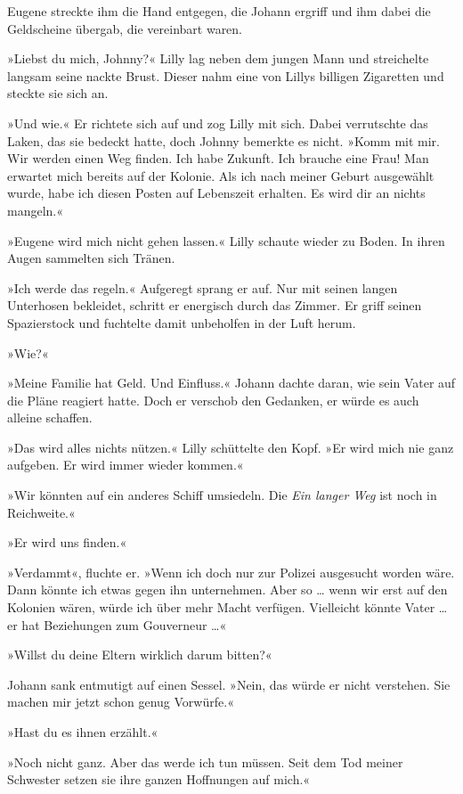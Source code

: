 Eugene streckte ihm die Hand entgegen, die Johann ergriff und ihm
dabei die Geldscheine übergab, die vereinbart waren.

\tb

»Liebst du mich, Johnny?« Lilly lag neben dem jungen Mann und
streichelte langsam seine nackte Brust. Dieser nahm eine von Lillys
billigen Zigaretten und steckte sie sich an.

»Und wie.« Er richtete sich auf und zog Lilly mit sich. Dabei
verrutschte das Laken, das sie bedeckt hatte, doch Johnny bemerkte
es nicht. »Komm mit mir. Wir werden einen Weg finden. Ich habe
Zukunft. Ich brauche eine Frau! Man erwartet mich bereits auf der
Kolonie. Als ich nach meiner Geburt ausgewählt wurde, habe ich
diesen Posten auf Lebenszeit erhalten. Es wird dir an nichts
mangeln.«

»Eugene wird mich nicht gehen lassen.« Lilly schaute wieder zu
Boden. In ihren Augen sammelten sich Tränen.

»Ich werde das regeln.« Aufgeregt sprang er auf. Nur mit seinen
langen Unterhosen bekleidet, schritt er energisch durch das Zimmer.
Er griff seinen Spazierstock und fuchtelte damit unbeholfen in der
Luft herum.

»Wie?«

»Meine Familie hat Geld. Und Einfluss.« Johann dachte daran, wie
sein Vater auf die Pläne reagiert hatte. Doch er verschob den
Gedanken, er würde es auch alleine schaffen.

»Das wird alles nichts nützen.« Lilly schüttelte den Kopf. »Er wird
mich nie ganz aufgeben. Er wird immer wieder kommen.«

»Wir könnten auf ein anderes Schiff umsiedeln. Die \textit{Ein langer Weg}
ist noch in Reichweite.«

»Er wird uns finden.«

»Verdammt«, fluchte er. »Wenn ich doch nur zur Polizei ausgesucht
worden wäre. Dann könnte ich etwas gegen ihn unternehmen. Aber so
\ldots{} wenn wir erst auf den Kolonien wären, würde ich über mehr Macht
verfügen. Vielleicht könnte Vater … er hat Beziehungen zum
Gouverneur …«

»Willst du deine Eltern wirklich darum bitten?«

Johann sank entmutigt auf einen Sessel. »Nein, das würde er nicht
verstehen. Sie machen mir jetzt schon genug Vorwürfe.«

»Hast du es ihnen erzählt.«

»Noch nicht ganz. Aber das werde ich tun müssen. Seit dem Tod
meiner Schwester setzen sie ihre ganzen Hoffnungen auf mich.«

